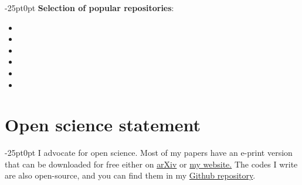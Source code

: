 \documentclass[line]{res}
\newenvironment{p11}
{\begin{adjustwidth}{-25pt}{0pt}
\vspace{8pt}}
{\end{adjustwidth}}
\begin{document}
\begin{resume}
\begin{p11}
\vspace{4pt}
\textbf{Selection of popular repositories}:
\begin{itemize}
	\item {}
	\item {}
	\item {}
	\item {}
	\item {}
	\item {}
\end{itemize}
\end{p11}

\section{Open science statement}
\begin{p11}\setlength{\parskip}{3pt}
I advocate for open science.
Most of my papers have an e-print version that can be downloaded for free either on \href{https://arxiv.org/search/physics?searchtype=author&query=Font%2C+B}{arXiv} or \href{https://b-fg.github.io/}{my website.}
The codes I write are also open-source, and you can find them in my \href{https://github.com/b-fg}{Github repository}.
\end{p11}

\end{resume}
\end{document}
